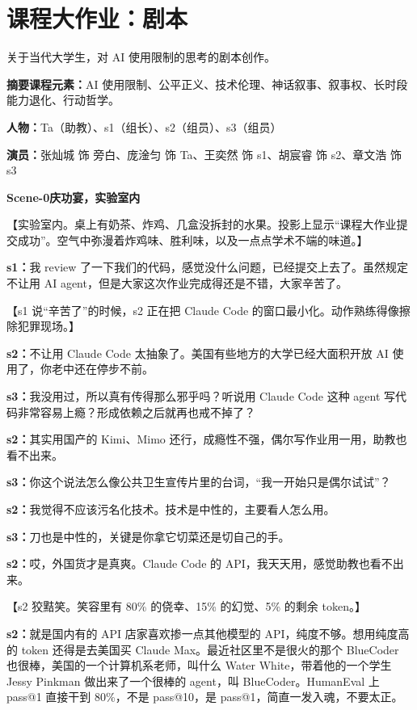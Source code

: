 \documentclass[12pt]{article}
\newcommand{\scene}[2]{%
  \clearpage
  {\Large\bfseries #1\quad #2}\par
  \vspace{0.6em}
}
\newcommand{\dialogue}[2]{%
  \textbf{#1：}#2\par
}
\newcommand{\stage}[1]{%
  {\sffamily\color{gray}#1}\par
}
\begin{document}
\section*{课程大作业：剧本}

关于当代大学生，对 AI 使用限制的思考的剧本创作。\par

\dialogue{摘要课程元素}{AI 使用限制、公平正义、技术伦理、神话叙事、叙事权、长时段能力退化、行动哲学。}

\dialogue{人物}{Ta（助教）、s1（组长）、s2（组员）、s3（组员）}

\dialogue{演员}{张灿城 饰 旁白、庞淦匀 饰 Ta、王奕然 饰 s1、胡宸睿 饰 s2、章文浩 饰 s3}

\scene{Scene-0}{庆功宴，实验室内}

\stage{【实验室内。桌上有奶茶、炸鸡、几盒没拆封的水果。投影上显示“课程大作业提交成功”。空气中弥漫着炸鸡味、胜利味，以及一点点学术不端的味道。】}

\dialogue{s1}{我 review 了一下我们的代码，感觉没什么问题，已经提交上去了。虽然规定不让用 AI agent，但是大家这次作业完成得还是不错，大家辛苦了。}

\stage{【s1 说“辛苦了”的时候，s2 正在把 Claude Code 的窗口最小化。动作熟练得像擦除犯罪现场。】}

\dialogue{s2}{不让用 Claude Code 太抽象了。美国有些地方的大学已经大面积开放 AI 使用了，你老中还在停步不前。}

\dialogue{s3}{我没用过，所以真有传得那么邪乎吗？听说用 Claude Code 这种 agent 写代码非常容易上瘾？形成依赖之后就再也戒不掉了？}

\dialogue{s2}{其实用国产的 Kimi、Mimo 还行，成瘾性不强，偶尔写作业用一用，助教也看不出来。}

\dialogue{s3}{你这个说法怎么像公共卫生宣传片里的台词，“我一开始只是偶尔试试”？}

\dialogue{s2}{我觉得不应该污名化技术。技术是中性的，主要看人怎么用。}

\dialogue{s3}{刀也是中性的，关键是你拿它切菜还是切自己的手。}

\dialogue{s2}{哎，外国货才是真爽。Claude Code 的 API，我天天用，感觉助教也看不出来。}

\stage{【s2 狡黠笑。笑容里有 80\% 的侥幸、15\% 的幻觉、5\% 的剩余 token。】}

\dialogue{s2}{就是国内有的 API 店家喜欢掺一点其他模型的 API，纯度不够。想用纯度高的 token 还得是去美国买 Claude Max。最近社区里不是很火的那个 BlueCoder 也很棒，美国的一个计算机系老师，叫什么 Water White，带着他的一个学生 Jessy Pinkman 做出来了一个很棒的 agent，叫 BlueCoder。HumanEval 上 pass@1 直接干到 80\%，不是 pass@10，是 pass@1，简直一发入魂，不要太正。}
\end{document}
